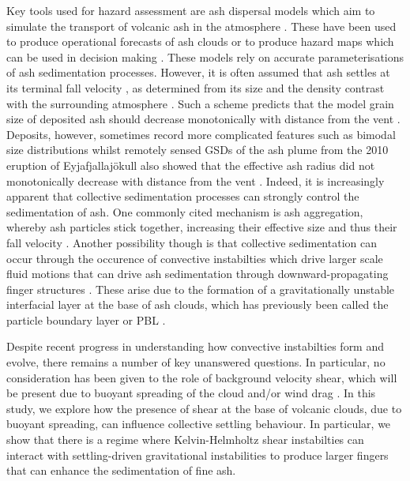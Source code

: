 \documentclass[authoryear,preprint,review,12pt]{elsarticle}
\begin{document}
Key tools used for hazard assessment are ash dispersal models which aim to simulate the transport of volcanic ash in the atmosphere \citep{Witham07, Bonadonna12, Folch12}. These have been used to produce operational forecasts of ash clouds \citep{Scollo09, Webster12} or to produce hazard maps which can be used in decision making \citep{Bonadonna05, Macedonio05, Folch10}. These models rely on accurate parameterisations of ash sedimentation processes. However, it is often assumed that ash settles at its terminal fall velocity \citep{Hazen04}, as determined from its size and the density contrast with the surrounding atmosphere \citep{Clift71, Ganser93}. Such a scheme predicts that the model grain size of deposited ash should decrease monotonically with distance from the vent \citep{Bursik92, Sparks92}. Deposits, however, sometimes record more complicated features such as bimodal size distributions whilst remotely sensed GSDs of the ash plume from the 2010 eruption of Eyjafjallaj{\"o}kull also showed that the effective ash radius did not monotonically decrease with distance from the vent \citep{Bonadonna11}. Indeed, it is increasingly apparent that collective sedimentation processes can strongly control the sedimentation of ash. One commonly cited mechanism is ash aggregation, whereby ash particles stick together, increasing their effective size and thus their fall velocity \citep{Carey82, Sorem82, Lane93, Bonadonna11, Brown12}. Another possibility though is that collective sedimentation can occur through the occurence of convective instabilties which drive larger scale fluid motions that can drive ash sedimentation through downward-propagating finger structures \citep{Bonadonna02, Bonadonna11, Carrazo12, Manzella15, Scollo17}. These arise due to the formation of a gravitationally unstable interfacial layer at the base of ash clouds, which has previously been called the particle boundary layer or PBL \citep{Carrazo12}.

Despite recent progress in understanding how convective instabilties form and evolve, there remains a number of key unanswered questions. In particular, no consideration has been given to the role of background velocity shear, which will be present due to buoyant spreading of the cloud and/or wind drag \citep{Johnson15}. In this study, we explore how the presence of shear at the base of volcanic clouds, due to buoyant spreading, can influence collective settling behaviour. In particular, we show that there is a regime where Kelvin-Helmholtz shear instabilties \citep{Helmholtz68, Kelvin71} can interact with settling-driven gravitational instabilities \citep{Hoyal99, Blanchette05} to produce larger fingers that can enhance the sedimentation of fine ash.
\end{document}
